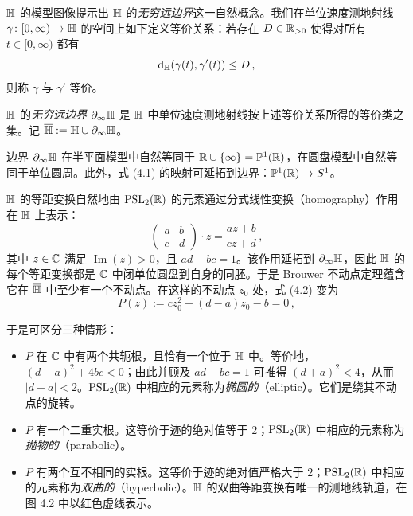 
$\mathbb{H}$ 的模型图像提示出 $\mathbb{H}$ 的\emph{无穷远边界}这一自然概念。我们在单位速度测地射线 $\gamma\colon[0,\infty)\to\mathbb{H}$ 的空间上如下定义等价关系：若存在 $D\in\mathbb{R}_{>0}$ 使得对所有 $t\in[0,\infty)$ 都有
\[
\mathrm{d}_{\mathbb{H}}(\gamma(t),\gamma'(t))\le D\,,
\]
则称 $\gamma$ 与 $\gamma'$ 等价。

\begin{definition}[4.1]
$\mathbb{H}$ 的\emph{无穷远边界} $\partial_\infty\mathbb{H}$ 是 $\mathbb{H}$ 中单位速度测地射线按上述等价关系所得的等价类之集。记 $\overline{\mathbb{H}}:=\mathbb{H}\cup\partial_\infty\mathbb{H}$。
\end{definition}

边界 $\partial_\infty\mathbb{H}$ 在半平面模型中自然等同于 $\mathbb{R}\cup\{\infty\}=\mathbb{P}^1(\mathbb{R})$，在圆盘模型中自然等同于单位圆周。此外，式 (4.1) 的映射可延拓到边界：$\mathbb{P}^1(\mathbb{R})\to S^1$。

$\mathbb{H}$ 的等距变换自然地由 $\operatorname{PSL}_2(\mathbb{R})$ 的元素通过分式线性变换（homography）作用在 $\mathbb{H}$ 上表示：
\begin{equation}
\begin{pmatrix} a & b\\ c & d\end{pmatrix}\cdot z=\frac{az+b}{cz+d}\,, \tag{4.2}
\end{equation}
其中 $z\in\mathbb{C}$ 满足 $\operatorname{Im}(z)>0$，且 $ad-bc=1$。该作用延拓到 $\partial_\infty\mathbb{H}$，因此 $\mathbb{H}$ 的每个等距变换都是 $\mathbb{C}$ 中闭单位圆盘到自身的同胚。于是 Brouwer 不动点定理蕴含它在 $\overline{\mathbb{H}}$ 中至少有一个不动点。在这样的不动点 $z_0$ 处，式 (4.2) 变为
\begin{equation}
P(z):=cz_0^2+(d-a)z_0-b=0\,, \tag{4.3}
\end{equation}

于是可区分三种情形：
\begin{itemize}
\item $P$ 在 $\mathbb{C}$ 中有两个共轭根，且恰有一个位于 $\mathbb{H}$ 中。等价地，$(d-a)^2+4bc<0$；由此并顾及 $ad-bc=1$ 可推得 $(d+a)^2<4$，从而 $|d+a|<2$。$\operatorname{PSL}_2(\mathbb{R})$ 中相应的元素称为\emph{椭圆的}（elliptic）。它们是绕其不动点的旋转。
\item $P$ 有一个二重实根。这等价于迹的绝对值等于 $2$；$\operatorname{PSL}_2(\mathbb{R})$ 中相应的元素称为\emph{抛物的}（parabolic）。
\item $P$ 有两个互不相同的实根。这等价于迹的绝对值严格大于 $2$；$\operatorname{PSL}_2(\mathbb{R})$ 中相应的元素称为\emph{双曲的}（hyperbolic）。$\mathbb{H}$ 的双曲等距变换有唯一的测地线轨道，在图 4.2 中以红色虚线表示。
\end{itemize}

